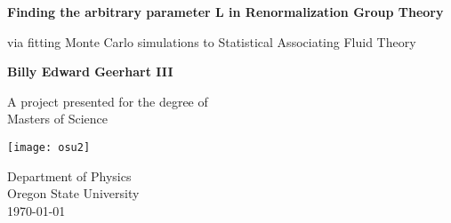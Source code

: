 \begin{titlepage}
	\begin{center}
	\vspace*{1cm}
	
	\Huge
	\textbf{Finding the arbitrary parameter L in Renormalization Group Theory}
	
	\vspace{0.5cm}
	\LARGE
	 via fitting Monte Carlo simulations to Statistical Associating Fluid Theory
	
	\vspace{1.5cm}
	
	\textbf{Billy Edward Geerhart III}
	
	\vfill
	
	A project presented for the degree of\\
	Masters of Science
	
	\vspace{0.8cm}
	
	\texttt{[image: osu2]}
	
	\Large
	Department of Physics\\
	Oregon State University\\
	\today
	
	\end{center}
\end{titlepage}